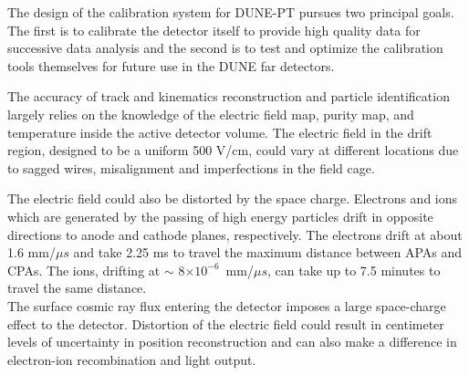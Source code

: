 \label{calibration}
The design of the calibration system for DUNE-PT pursues two principal goals. The first is to calibrate the detector itself to
provide high quality data for successive data analysis and the second is to test and optimize the calibration tools themselves for future
use in the DUNE far detectors.

The accuracy of track and kinematics reconstruction and particle identification largely relies on the knowledge of the electric field map, purity map, and temperature inside the active detector volume. The electric field in the drift region, designed to be a uniform 500 V/cm, could vary at different locations due to sagged wires, misalignment and imperfections in the field cage. 


The electric field could also be distorted by the space charge.  Electrons and ions which are generated by the passing of high energy particles drift in opposite directions to anode and cathode planes, respectively. The electrons drift at about 1.6 mm/$\mu s$ and take 2.25 ms to travel the maximum distance between APAs and CPAs. The ions, drifting at $\sim$ 8$\times 10^{-6}$~mm/$\mu s$, can take up to 7.5 minutes to travel the same distance. \\
The surface cosmic ray flux entering the detector imposes a large space-charge effect to the detector. 
Distortion of the electric field could result in centimeter levels of uncertainty in position reconstruction and can also make a difference in electron-ion recombination and light output. 

